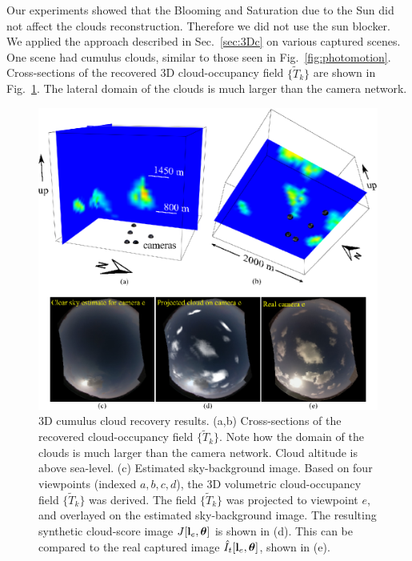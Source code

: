 \documentclass[runningheads]{llncs}
\begin{document}
Our experiments showed that the Blooming and Saturation due to the Sun did not affect the clouds reconstruction. Therefore we did not use the sun blocker.
We applied the approach described in Sec.~\ref{sec:3Dc} on various captured scenes. One scene had cumulus clouds, similar to those seen in Fig.~\ref{fig:photomotion}.
%
%
Cross-sections of the recovered 3D cloud-occupancy field $\{\tilde T_k\}$ are shown in Fig.~\ref{fig:projection}. The lateral domain of the clouds is much larger than the camera network.
\begin{figure}[t!]
\begin{center}
   \includegraphics[width=1\linewidth]{figures/clouds_reconstructions.eps}
\end{center}
   \vspace{-0.6cm}
   \caption{3D cumulus cloud recovery results. (a,b) Cross-sections of the recovered cloud-occupancy field $\{\tilde T_k\}$. Note how the domain of the clouds is much larger than the camera network. Cloud
   altitude is above sea-level. (c) Estimated sky-background image.  Based on four viewpoints (indexed $a,b,c,d$), the 3D volumetric cloud-occupancy field $\{\tilde T_k\}$ was derived. The field $\{\tilde T_k\}$ was projected to viewpoint $e$, and overlayed on the estimated sky-background image. The resulting synthetic cloud-score image $J[{\bf l}_e,{\bm \theta}]$ is shown in (d). This can be compared to the real captured image $\hat I_t[{\bf l}_e,{\bm \theta}]$, shown in (e).}
\label{fig:projection}
\end{figure}
\end{document}
